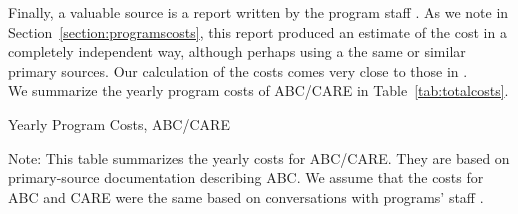 \noindent Finally, a valuable source is a report written by the program staff \citet{FPG_1979_Progress-Report}. As we note in Section~\ref{section:programscosts}, this report produced an estimate of the cost in a completely independent way, although perhaps using a the same or similar primary sources. Our calculation of the costs comes very close to those in \citet{FPG_1979_Progress-Report}. \\

\noindent We summarize the yearly program costs of ABC/CARE in Table~\ref{tab:totalcosts}. \\

\begin{table}[H]
\centering
\begin{threeparttable}
\caption{Yearly Program Costs, ABC/CARE} \label{tab:totalcosts}
\footnotesize

\begin{tablenotes}
\footnotesize
\item Note: This table summarizes the yearly costs for ABC/CARE. They are based on primary-source documentation describing ABC. We assume that the costs for ABC and CARE were the same based on conversations with programs' staff \citep{projectcare2014interviews,abc2014-2015interviews}. \\
\end{tablenotes}
\end{threeparttable}
\end{table}